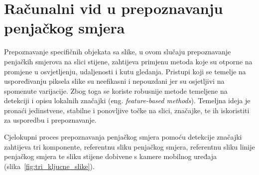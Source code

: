 \chapter{Računalni vid u prepoznavanju penjačkog smjera}

Prepoznavanje specifičnih objekata sa slike, u ovom slučaju prepoznavanje penjačkih smjerova na slici stijene, zahtijeva primjenu metoda koje su otporne na promjene u osvjetljenju, udaljenosti i kutu gledanja. Pristupi koji se temelje na uspoređivanju piksela slike su neefikasni i nepouzdani jer su osjetljivi na spomenute varijacije. Zbog toga se koriste robusnije metode temeljene na detekciji i opisu lokalnih značajki (eng. \textit{feature-based methods}). Temeljna ideja je pronaći jedinstvene, stabilne i ponovljive točke na slici, značajke, te ih iskoristiti za usporedbu i prepoznavanje.

Cjelokupni proces prepoznavanja penjačkog smjera pomoću detekcije značajki zahtijeva tri komponente, referentnu sliku penjačkog smjera, referentnu sliku linije penjačkog smjera te sliku stijene dobivene s kamere mobilnog uređaja (slika~\ref{fig:tri_kljucne_slike}).

